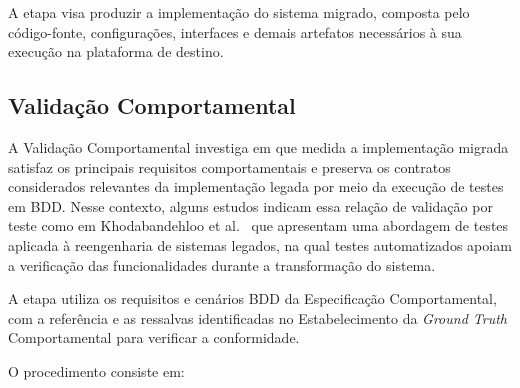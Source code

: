 A etapa visa produzir a implementação do sistema
migrado, composta pelo código-fonte,
configurações, interfaces e demais artefatos
necessários à sua execução na plataforma
de destino.

\subsection{Validação Comportamental}
\label{sec:validacao-comportamental}

A Validação Comportamental investiga em que medida a implementação migrada satisfaz os principais requisitos comportamentais e preserva os contratos considerados relevantes da implementação legada por meio da execução de testes em BDD. Nesse contexto, alguns estudos indicam essa relação de validação por teste como em  Khodabandehloo et al.~\cite{Khodabandehloo2021} que apresentam uma abordagem de testes aplicada à reengenharia de sistemas legados, na qual testes automatizados apoiam a verificação das funcionalidades durante a transformação do sistema.

A etapa utiliza os requisitos e cenários BDD
da Especificação Comportamental, 
com a referência e as ressalvas identificadas
no Estabelecimento da \textit{Ground Truth}
Comportamental para verificar a conformidade. 

O procedimento consiste em:

